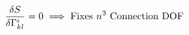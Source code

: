\documentclass[preview]{standalone}
\begin{document}
\begin{align*}
\special{dvisvgm:raw <g id='unique000'>}\frac{\delta S}{\delta\Gamma_{kl}^i} = 0 \implies \text{Fixes }n^3\text{ Connection DOF}\special{dvisvgm:raw </g>}
\end{align*}
\end{document}
